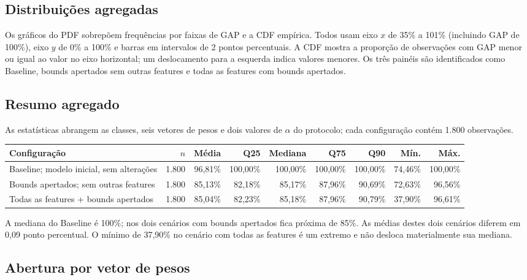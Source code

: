 \documentclass[11pt,a4paper]{article}
\begin{document}
\subsection{Distribuições agregadas}

Os gráficos do PDF sobrepõem frequências por faixas de GAP e a CDF empírica.
Todos usam eixo $x$ de 35\% a 101\% (incluindo GAP de 100\%), eixo $y$ de 0\%
a 100\% e barras em intervalos de 2 pontos percentuais. A CDF mostra a
proporção de observações com GAP menor ou igual ao valor no eixo horizontal;
um deslocamento para a esquerda indica valores menores. Os três painéis são
identificados como Baseline, bounds apertados sem outras features e todas as
features com bounds apertados.

\subsection{Resumo agregado}

As estatísticas abrangem as classes, seis vetores de pesos e dois valores de
$\alpha$ do protocolo; cada configuração contém 1.800 observações.

\begin{center}\small
\begin{tabular}{lrrrrrrrr}
\toprule
Configuração & $n$ & Média & Q25 & Mediana & Q75 & Q90 & Mín. & Máx. \\
\midrule
Baseline; modelo inicial, sem alterações & 1.800 & 96,81\% & 100,00\% & 100,00\% & 100,00\% & 100,00\% & 74,46\% & 100,00\% \\
Bounds apertados; sem outras features & 1.800 & 85,13\% & 82,18\% & 85,17\% & 87,96\% & 90,69\% & 72,63\% & 96,56\% \\
Todas as features + bounds apertados & 1.800 & 85,04\% & 82,23\% & 85,18\% & 87,96\% & 90,79\% & 37,90\% & 96,61\% \\
\bottomrule
\end{tabular}
\end{center}

A mediana do Baseline é 100\%; nos dois cenários com bounds apertados fica
próxima de 85\%. As médias destes dois cenários diferem em 0,09 ponto
percentual. O mínimo de 37,90\% no cenário com todas as features é um extremo
e não desloca materialmente sua mediana.

\subsection{Abertura por vetor de pesos}
\end{document}
